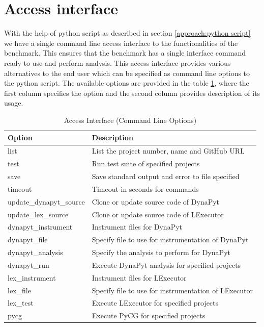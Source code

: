 \section{Access interface}
\label{approach:access interface}
With the help of python script as described in section \ref{approach:python script} we have a single command line access interface to the functionalities of the benchmark. This ensures that the benchmark has a single interface command ready to use and perform analysis. This access interface provides various alternatives to the end user which can be specified as command line options to the python script. The available options are provided in the table \ref{table:access interface options}, where the first column specifies the option and the second column provides description of its usage.

\begin{table}[ht]
    \centering
    \begin{tabular}{ll}
    \hline
    \textbf{Option} & \textbf{Description}\\
    \hline
    list    & List the project number, name and GitHub URL\\
    test    & Run test suite of specified projects\\
    save    & Save standard output and error to file specified\\
    timeout & Timeout in seconds for commands\\
    update\_dynapyt\_source   & Clone or update source code of DynaPyt\\
    update\_lex\_source   & Clone or update source code of LExecutor\\
    dynapyt\_instrument  & Instrument files for DynaPyt\\
    dynapyt\_file    & Specify file to use for instrumentation of DynaPyt\\
    dynapyt\_analysis    & Specify the analysis to perform for DynaPyt\\
    dynapyt\_run & Execute DynaPyt analysis for specified projects\\
    lex\_instrument  & Instrument files for LExecutor\\
    lex\_file    & Specify file to use for instrumentation of LExecutor\\
    lex\_test    & Execute LExecutor for specified projects\\
    pycg    & Execute PyCG for specified projects\\
    \hline
    \end{tabular}
    \caption{Access Interface (Command Line Options)}
    \label{table:access interface options}
\end{table}

